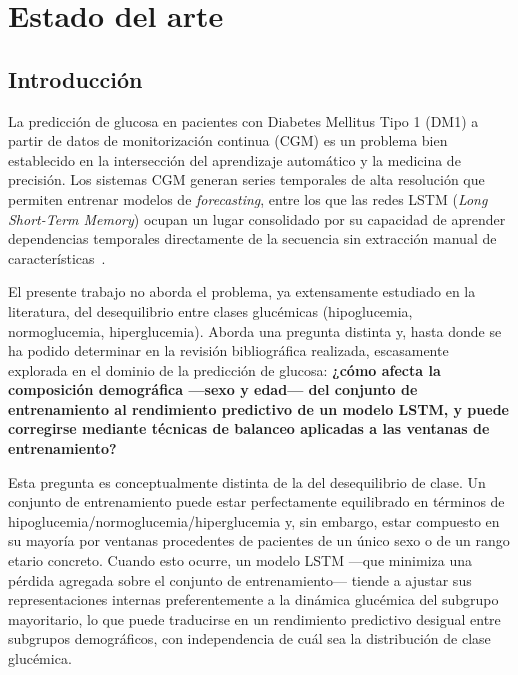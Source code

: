 \label{chapter:estado-arte}
\chapter[Estado del arte]{Estado del arte}

\section{Introducción}

La predicción de glucosa en pacientes con Diabetes Mellitus Tipo 1 (DM1) a partir de datos de monitorización continua (CGM) es un problema bien establecido en la intersección del aprendizaje automático y la medicina de precisión. Los sistemas CGM generan series temporales de alta resolución que permiten entrenar modelos de \emph{forecasting}, entre los que las redes LSTM (\emph{Long Short-Term Memory}) ocupan un lugar consolidado por su capacidad de aprender dependencias temporales directamente de la secuencia sin extracción manual de características~\cite{hochreiter1997long,mirshekarian2019using}.

El presente trabajo no aborda el problema, ya extensamente estudiado en la literatura, del desequilibrio entre clases glucémicas (hipoglucemia, normoglucemia, hiperglucemia). Aborda una pregunta distinta y, hasta donde se ha podido determinar en la revisión bibliográfica realizada, escasamente explorada en el dominio de la predicción de glucosa: \textbf{¿cómo afecta la composición demográfica —sexo y edad— del conjunto de entrenamiento al rendimiento predictivo de un modelo LSTM, y puede corregirse mediante técnicas de balanceo aplicadas a las ventanas de entrenamiento?}

Esta pregunta es conceptualmente distinta de la del desequilibrio de clase. Un conjunto de entrenamiento puede estar perfectamente equilibrado en términos de hipoglucemia/normoglucemia/hiperglucemia y, sin embargo, estar compuesto en su mayoría por ventanas procedentes de pacientes de un único sexo o de un rango etario concreto. Cuando esto ocurre, un modelo LSTM —que minimiza una pérdida agregada sobre el conjunto de entrenamiento— tiende a ajustar sus representaciones internas preferentemente a la dinámica glucémica del subgrupo mayoritario, lo que puede traducirse en un rendimiento predictivo desigual entre subgrupos demográficos, con independencia de cuál sea la distribución de clase glucémica.


